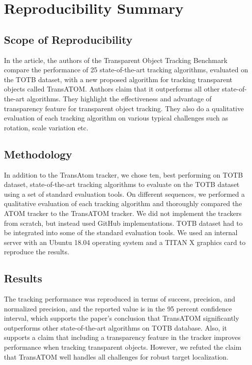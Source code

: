\section{Reproducibility Summary}

\subsection*{Scope of Reproducibility}
In the article, the authors of the Transparent Object Tracking Benchmark compare the performance of 25 state-of-the-art tracking algorithms, evaluated on the TOTB dataset, with a new proposed algorithm for tracking transparent objects called TransATOM. Authors claim that it outperforms all other state-of-the-art algorithms. They highlight the effectiveness and advantage of transparency feature for transparent object tracking. They also do a qualitative evaluation of each tracking algorithm on various typical challenges such as rotation, scale variation etc.

\subsection*{Methodology}
In addition to the TransAtom tracker, we chose ten, best performing on TOTB dataset, state-of-the-art tracking algorithms to evaluate on the TOTB dataset using a set of standard evaluation tools. On different sequences, we performed a qualitative evaluation of each tracking algorithm and thoroughly compared the ATOM tracker to the TransATOM tracker. We did not implement the trackers from scratch, but instead used GitHub implementations. TOTB dataset had to be integrated into some of the standard evaluation tools. We used an internal server with an Ubuntu 18.04 operating system and a TITAN X graphics card to reproduce the results.
\subsection*{Results}
\noindent
The tracking performance was reproduced in terms of success, precision, and normalized precision, and the reported value is in the 95 percent confidence interval, which supports the paper's conclusion that TransATOM significantly outperforms other state-of-the-art algorithms on TOTB database. Also, it supports a claim that including a transparency feature in the tracker improves performance when tracking transparent objects. However, we refuted the claim that TransATOM well handles all challenges for robust target localization.

